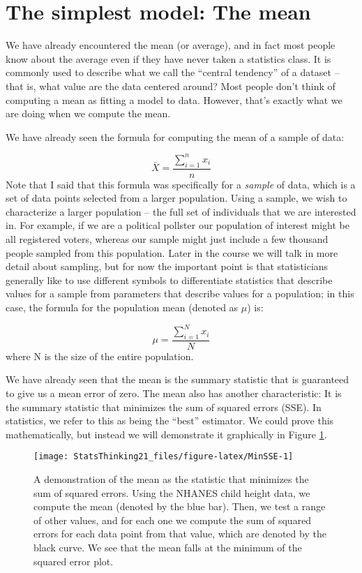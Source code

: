 \documentclass[]{book}
\theoremstyle{definition}
\theoremstyle{definition}
\theoremstyle{definition}
\theoremstyle{remark}
\begin{document}
\section{The simplest model: The
mean}\label{the-simplest-model-the-mean}

We have already encountered the mean (or average), and in fact most
people know about the average even if they have never taken a statistics
class. It is commonly used to describe what we call the ``central
tendency'' of a dataset -- that is, what value are the data centered
around? Most people don't think of computing a mean as fitting a model
to data. However, that's exactly what we are doing when we compute the
mean.

We have already seen the formula for computing the mean of a sample of
data:

\[
\bar{X} = \frac{\sum_{i=1}^{n}x_i}{n}
\] Note that I said that this formula was specifically for a
\emph{sample} of data, which is a set of data points selected from a
larger population. Using a sample, we wish to characterize a larger
population -- the full set of individuals that we are interested in. For
example, if we are a political pollster our population of interest might
be all registered voters, whereas our sample might just include a few
thousand people sampled from this population. Later in the course we
will talk in more detail about sampling, but for now the important point
is that statisticians generally like to use different symbols to
differentiate statistics that describe values for a sample from
parameters that describe values for a population; in this case, the
formula for the population mean (denoted as \(\mu\)) is:

\[
\mu = \frac{\sum_{i=1}^{N}x_i}{N}
\] where N is the size of the entire population.

We have already seen that the mean is the summary statistic that is
guaranteed to give us a mean error of zero. The mean also has another
characteristic: It is the summary statistic that minimizes the sum of
squared errors (SSE). In statistics, we refer to this as being the
``best'' estimator. We could prove this mathematically, but instead we
will demonstrate it graphically in Figure \ref{fig:MinSSE}.

\begin{figure}
\texttt{[image: StatsThinking21\_files/figure-latex/MinSSE-1]} \caption{A demonstration of the mean as the statistic that minimizes the sum of squared errors.  Using the NHANES child height data, we compute the mean (denoted by the blue bar). Then, we test a range of other values, and for each one we compute the sum of squared errors for each data point from that value, which are denoted by the black curve.  We see that the mean falls at the minimum of the squared error plot.}\label{fig:MinSSE}
\end{figure}
\end{document}
